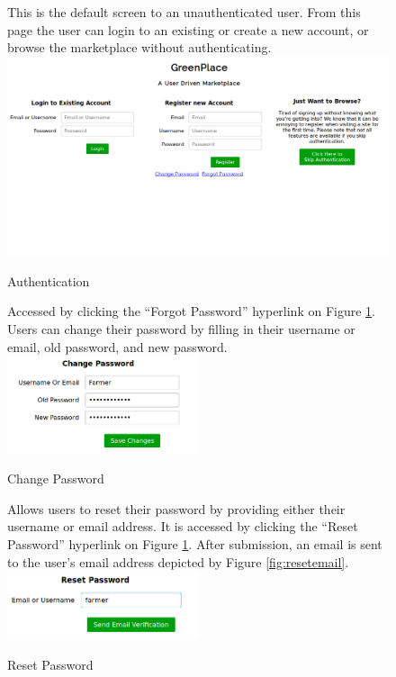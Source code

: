 \documentclass[letterpaper, 10 pt, conference]{ieeeconf}  %
\begin{document}
\begin{figure}[H]
  \caption{Authentication}
  This is the default screen to an unauthenticated user. From this page the user can login to an existing or create a new account, or browse the marketplace without authenticating.\\
  \label{fig:authentication}
  \centering
    \includegraphics[width=\textwidth]{images/authentication.png}
\end{figure}

\begin{figure}[H]
  \caption{Change Password}
  Accessed by clicking the ``Forgot Password'' hyperlink on Figure \ref{fig:authentication}. Users can change their password by filling in their username or email, old password, and new password.\\
  \label{fig:changepassword}
  \centering
    \includegraphics[width=0.5\textwidth]{images/changepassword.png}
\end{figure}

\begin{figure}[H]
  \caption{Reset Password}
  Allows users to reset their password by providing either their username or email address. It is accessed by clicking the ``Reset Password'' hyperlink on Figure \ref{fig:authentication}. After submission, an email is sent to the user's email address depicted by Figure \ref{fig:resetemail}.\\
  \label{fig:resetpassword}
  \centering
    \includegraphics[width=0.5\textwidth]{images/resetpassword.png}
\end{figure}
\end{document}
